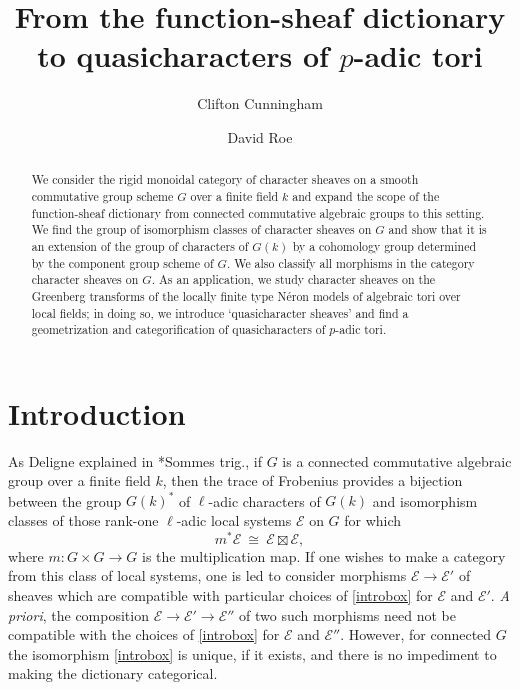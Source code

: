 \documentclass[10pt]{amsart}
\title{From the function-sheaf dictionary to quasicharacters of $p$-adic tori}
\author{Clifton Cunningham}
\author{David Roe}
\theoremstyle{plain}
\theoremstyle{definition}
\newcommand{\Fq}{k}
\newcommand{\iso}{{\ \cong\ }}
\newcommand{\cs}[1]{{\mathcal{#1}}}
\begin{document}
\begin{abstract}
We consider the rigid monoidal category of character sheaves on a smooth commutative group scheme $G$ over a finite field
$k$ and expand the scope of the function-sheaf dictionary from connected commutative algebraic groups to this setting.
We find the group of isomorphism classes of character sheaves on $G$ and show that it is an extension of the group
of characters of $G(k)$ by a cohomology group determined by the component group scheme of $G$.
We also classify all morphisms in the category character sheaves on $G$.
As an application, we study character sheaves on the Greenberg transforms of the locally finite type N\'eron models
of algebraic tori over local fields; in doing so, we introduce `quasicharacter sheaves' and find a geometrization and
categorification of quasi\-characters of $p$-adic tori.
\end{abstract}

\maketitle

\section*{Introduction}


As Deligne explained in \cite{deligne:SGA4.5}*{Sommes trig.}, if $G$ is a connected commutative algebraic group
over a finite field $k$, then the trace of Frobenius provides a bijection between the group $G(\Fq)^*$ of $\ell$-adic
characters of $G(\Fq)$ and isomorphism classes of those rank-one $\ell$-adic local systems $\mathcal{E}$ on $G$ for which 
\begin{equation}\label{introbox}
m^* \cs{E} \iso \cs{E} \boxtimes \cs{E},
\end{equation}
where $m : G\times G\to G$ is the multiplication map.
%
If one wishes to make a category from this class of local systems, one is led to consider morphisms
$\cs{E} \to \cs{E}'$ of sheaves which are compatible with particular choices of \eqref{introbox} for $\cs{E}$ and $\cs{E'}$. 
{\it A priori}, the composition $\cs{E} \to \cs{E}' \to \cs{E}''$ of two such morphisms need not be
compatible with the choices of \eqref{introbox} for $\cs{E}$ and $\cs{E}''$.
 However, for connected $G$ the isomorphism \eqref{introbox} is unique, if it exists, and there is no impediment
 to making the dictionary categorical.
\end{document}
